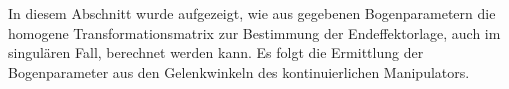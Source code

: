 In diesem Abschnitt wurde aufgezeigt, wie aus gegebenen Bogenparametern die homogene Transformationsmatrix zur Bestimmung der Endeffektorlage, auch im singulären Fall, berechnet werden kann. Es folgt die Ermittlung der Bogenparameter aus den Gelenkwinkeln des kontinuierlichen Manipulators.

%
%
%
%
%

